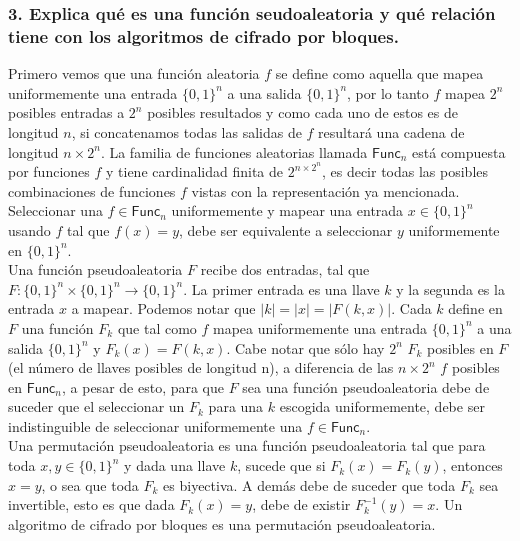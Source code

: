 \documentclass[12pt]{article}
\begin{document}
\subsubsection*{3. Explica qué es una función seudoaleatoria y qué relación tiene con los algoritmos de cifrado por bloques.}
Primero vemos que una función aleatoria $f$ se define como aquella que mapea uniformemente una entrada $\{0, 1\}^n$ a una salida $\{0, 1\}^n$, por lo tanto $f$ mapea $2^n$ posibles entradas a $2^n$ posibles resultados y como cada uno de estos es de longitud $n$, si concatenamos todas las salidas de $f$ resultará una cadena de longitud $n \times 2^n$. La familia de funciones aleatorias llamada $\textsf{Func}_n$ está compuesta por funciones $f$ y tiene cardinalidad finita de $2^{n\times2^n}$, es decir todas las posibles combinaciones de funciones $f$ vistas con la representación ya mencionada. Seleccionar una $f \in \textsf{Func}_n$ uniformemente  y mapear una entrada $x \in \{0, 1\}^n$ usando $f$ tal que $f(x) = y$, debe ser equivalente a seleccionar $y$ uniformemente en $\{0, 1\}^n$. \\

Una función pseudoaleatoria $F$ recibe dos entradas, tal que $F : \{0, 1\}^n \times \{0, 1\}^n \rightarrow \{0, 1\}^n$. La primer entrada es una llave $k$ y la segunda es la entrada $x$ a mapear. Podemos notar que $|k| = |x| = |F(k,x)|$. Cada $k$ define en $F$ una función $F_k$ que tal como $f$ mapea uniformemente una entrada $\{0, 1\}^n$ a una salida $\{0, 1\}^n$ y $F_k(x) = F(k, x)$. Cabe notar que sólo hay $2^n$ $F_k$ posibles en $F$ (el número de llaves posibles de longitud n), a diferencia de las $n\times2^n$ $f$ posibles en $\textsf{Func}_n$, a pesar de esto, para que $F$ sea una función pseudoaleatoria debe de suceder que el seleccionar un $F_k$ para una $k$ escogida uniformemente, debe ser indistinguible de seleccionar uniformemente una $f \in \textsf{Func}_n$. \\

Una permutación pseudoaleatoria es una función pseudoaleatoria tal que para toda $x, y \in \{0, 1\}^n$ y dada una llave $k$, sucede que si $F_k(x) = F_k(y)$, entonces $x = y$, o sea que toda $F_k$ es biyectiva. A demás debe de suceder que toda $F_k$ sea invertible, esto es que dada $F_k(x) = y$, debe de existir $F_k^{-1}(y) = x$. Un algoritmo de cifrado por bloques es una permutación pseudoaleatoria.
\end{document}
